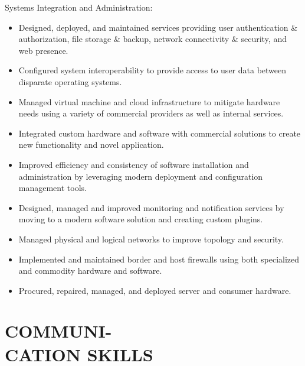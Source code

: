 \documentclass[line,margin]{res}
\begin{document}
\begin{resume}
    Systems Integration and Administration:
    \vspace{1 mm}
    \begin{itemize}
        \item Designed, deployed, and maintained services providing
            user authentication \& authorization, file storage \& backup,
            network connectivity \& security, and web presence.
        \item Configured system interoperability to provide access to user
            data between disparate operating systems.
        \item Managed virtual machine and cloud infrastructure to mitigate
            hardware needs using a variety of commercial providers as well
            as internal services.
        \item Integrated custom hardware and software with commercial
            solutions to create new functionality and novel application.
        \item Improved efficiency and consistency of software installation
            and administration by leveraging modern deployment and
            configuration management tools.
        \item Designed, managed and improved monitoring and notification
            services by moving to a modern software solution and creating
            custom plugins.
        \item Managed physical and logical networks to improve topology
            and security.
        \item Implemented and maintained border and host firewalls using
            both specialized and commodity hardware and software.
        \item Procured, repaired, managed, and deployed server and
            consumer hardware.
    \end{itemize}

\section{COMMUNI- \\ CATION SKILLS}


\end{resume}
\end{document}
